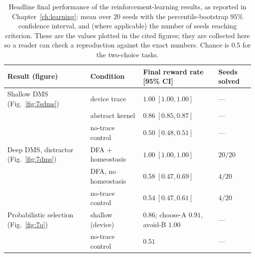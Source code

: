 \begin{table}[htbp!]
    \caption[Reported final results with confidence intervals.]{Headline final
    performance of the reinforcement-learning results, as reported in
    Chapter~\ref{ch:learning}: mean over $20$ seeds with the percentile-bootstrap $95\%$
    confidence interval, and (where applicable) the number of seeds reaching criterion.
    These are the values plotted in the cited figures; they are collected here so a
    reader can check a reproduction against the exact numbers. Chance is $0.5$ for the
    two-choice tasks.}
    \begin{center}
    \footnotesize
    \begin{tabularx}{\textwidth}{@{}X l l l@{}}
    \toprule
    Result (figure) & Condition & Final reward rate [95\% CI] & Seeds solved \\
    \midrule
    Shallow DMS (Fig.~\ref{fig:7sdms}) & device trace     & $1.00\ [1.00,1.00]$ & --- \\
                                       & abstract kernel  & $0.86\ [0.85,0.87]$ & --- \\
                                       & no-trace control & $0.50\ [0.48,0.51]$ & --- \\
    \midrule
    Deep DMS, distractor (Fig.~\ref{fig:7dms}) & DFA $+$ homeostasis & $1.00\ [1.00,1.00]$ & $20/20$ \\
                                       & DFA, no homeostasis & $0.58\ [0.47,0.69]$ & $4/20$ \\
                                       & no-trace control    & $0.54\ [0.47,0.61]$ & $4/20$ \\
    \midrule
    Probabilistic selection (Fig.~\ref{fig:7q}) & shallow (device) & $0.86$; choose-A $0.91$, avoid-B $1.00$ & --- \\
                                       & no-trace control & $0.51$ & --- \\
    \bottomrule
    \end{tabularx}
    \label{table:A8}
    \end{center}
    \vspace*{-\baselineskip}
\end{table}

\FloatBarrier
